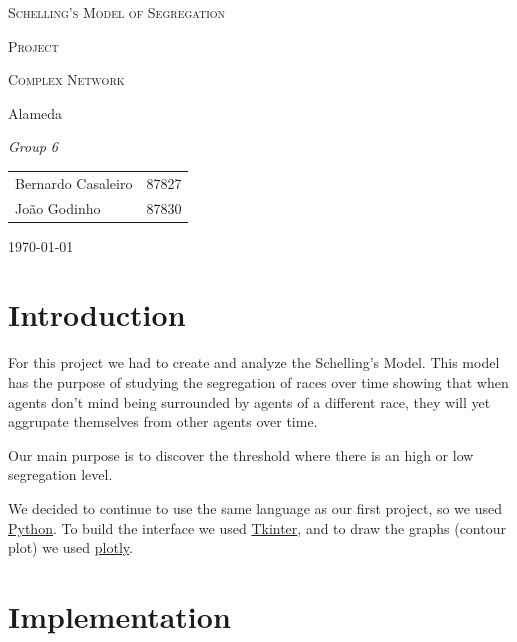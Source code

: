\documentclass[a4paper,titlepage,11pt]{article}
\begin{document}
\begin{titlepage}
  \begin{center}
    {\scshape \huge Schelling's Model of Segregation \par}
    \vspace{1cm}

    {\scshape \LARGE Project \par}
    \vspace{1.5cm}

    {\scshape \Large Complex Network \par}
    \vspace{0.5cm}

    {\Large Alameda \par}
    \vfill

    {\itshape \Large Group 6 \par}
    \vfill

    \begin{tabular}{l l}
      Bernardo Casaleiro & 87827\\
      João Godinho & 87830\\
    \end{tabular}
    \vfill

    {\large \today\par}
  \end{center}
\end{titlepage}

\section{Introduction}
For this project we had to create and analyze the Schelling's Model. This model has the purpose of studying the segregation of races over time showing that when agents don't mind being surrounded by agents of a different race, they will yet aggrupate themselves from other agents over time.

Our main purpose is to discover the threshold where there is an high or low segregation level.

We decided to continue to use the same language as our first project, so we used \href{https://www.python.org}{Python}. To build the interface we used \href{https://wiki.python.org/moin/TkInter}{Tkinter}, and to draw the graphs (contour plot) we used \href{https://plot.ly/}{plotly}.

\newpage

\section{Implementation}
\end{document}

